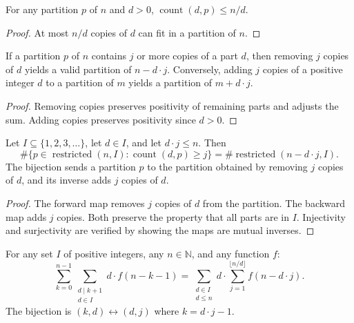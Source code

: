 \begin{lemma}
\label{lem.pars.count-le-div}
\leanhelper
\leanok
For any partition $p$ of $n$ and $d > 0$,
$\operatorname{count}(d, p) \leq n/d$.
\end{lemma}

\begin{proof}
\leanok
At most $n/d$ copies of $d$ can fit in a partition of $n$.
\end{proof}

\begin{lemma}
\label{lem.pars.removePartCopies}
\leanhelper
\leanok
If a partition $p$ of $n$ contains $j$ or more copies of a part $d$,
then removing $j$ copies of $d$ yields a valid partition of $n - d \cdot j$.
Conversely, adding $j$ copies of a positive integer $d$ to a partition of $m$
yields a partition of $m + d \cdot j$.
\end{lemma}

\begin{proof}
\leanok
Removing copies preserves positivity of remaining parts and adjusts the sum.
Adding copies preserves positivity since $d > 0$.
\end{proof}

\begin{lemma}
\label{lem.pars.card-count-ge-eq-restricted}
\leanhelper
\leanok
Let $I \subseteq \{1, 2, 3, \ldots\}$, let $d \in I$, and let $d \cdot j \leq n$.
Then
\[
\#\{p \in \operatorname{restricted}(n, I) : \operatorname{count}(d, p) \geq j\}
= \#\operatorname{restricted}(n - d \cdot j, I).
\]
The bijection sends a partition $p$ to the partition obtained by removing $j$
copies of $d$, and its inverse adds $j$ copies of $d$.
\end{lemma}

\begin{proof}
The forward map removes $j$ copies of $d$ from the partition.
The backward map adds $j$ copies. Both preserve the property that all parts are in $I$.
Injectivity and surjectivity are verified by showing the maps are mutual inverses.
\end{proof}

\begin{lemma}
\label{lem.pars.divisor-sum-reindex}
\leanhelper
\leanok
For any set $I$ of positive integers, any $n \in \mathbb{N}$, and any function $f$:
\[
\sum_{k=0}^{n-1} \sum_{\substack{d \mid k+1 \\ d \in I}} d \cdot f(n - k - 1)
= \sum_{\substack{d \in I \\ d \leq n}} d \cdot \sum_{j=1}^{\lfloor n/d \rfloor} f(n - d \cdot j).
\]
The bijection is $(k, d) \leftrightarrow (d, j)$ where $k = d \cdot j - 1$.
\end{lemma}

